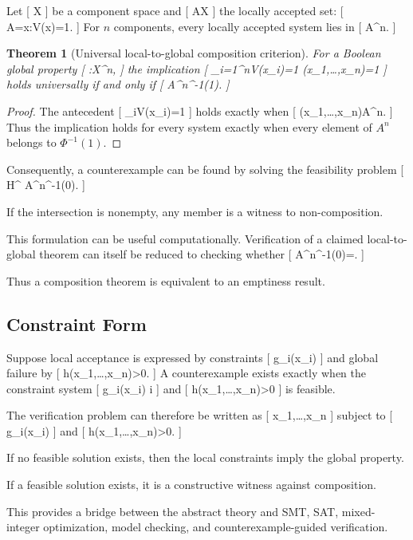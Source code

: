\documentclass[11pt]{article}
\newtheorem{theorem}{Theorem} \newtheorem{proposition}{Proposition} \newtheorem{lemma}{Lemma} \newtheorem{corollary}{Corollary} \newtheorem{definition}{Definition} \newtheorem{remark}{Remark}
\begin{document}
Let
[
\mathcal X
]
be a component space and
[
A\subseteq\mathcal X
]
the locally accepted set:
[
A={x:V(x)=1}.
]
For $n$ components, every locally accepted system lies in
[
A^n.
]

\begin{theorem}[Universal local-to-global composition criterion]
For a Boolean global property
[
\Phi:\mathcal X^n,
]
the implication
[
\bigwedge_{i=1}^{n}V(x_i)=1
\Longrightarrow
\Phi(x_1,\ldots,x_n)=1
]
holds universally if and only if
[
A^n\subseteq\Phi^{-1}(1).
]
\end{theorem}

\begin{proof}
The antecedent
[
\bigwedge_iV(x_i)=1
]
holds exactly when
[
(x_1,\ldots,x_n)\in A^n.
]
Thus the implication holds for every system exactly when every element of $A^n$ belongs to $\Phi^{-1}(1)$.
\end{proof}

Consequently, a counterexample can be found by solving the feasibility problem
[
H^\star
\in
A^n\cap\Phi^{-1}(0).
]

If the intersection is nonempty, any member is a witness to non-composition.

This formulation can be useful computationally. Verification of a claimed local-to-global theorem can itself be reduced to checking whether
[
A^n\cap\Phi^{-1}(0)=\varnothing.
]

Thus a composition theorem is equivalent to an emptiness result.

\subsection{Constraint Form}

Suppose local acceptance is expressed by constraints
[
g_i(x_i)
]
and global failure by
[
h(x_1,\ldots,x_n)>0.
]
A counterexample exists exactly when the constraint system
[
g_i(x_i)
\qquad
\forall i
]
and
[
h(x_1,\ldots,x_n)>0
]
is feasible.

The verification problem can therefore be written as
[
x_1,\ldots,x_n
]
subject to
[
g_i(x_i)
]
and
[
h(x_1,\ldots,x_n)>0.
]

If no feasible solution exists, then the local constraints imply the global property.

If a feasible solution exists, it is a constructive witness against composition.

This provides a bridge between the abstract theory and SMT, SAT, mixed-integer optimization, model checking, and counterexample-guided verification.
\end{document}
